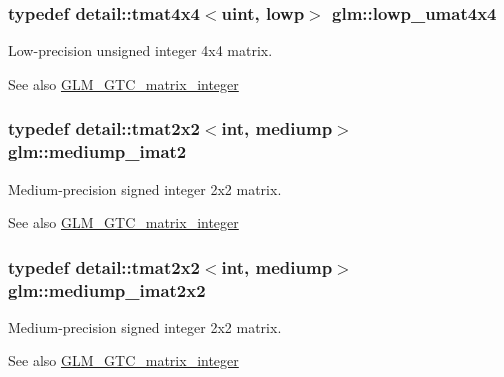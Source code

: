 \subsubsection[{\texorpdfstring{lowp\+\_\+umat4x4}{lowp_umat4x4}}]{\setlength{\rightskip}{0pt plus 5cm}typedef detail\+::tmat4x4$<$uint, lowp$>$ {\bf glm\+::lowp\+\_\+umat4x4}}\hypertarget{group__gtc__matrix__integer_ga394ee910348beffe9c7d6b694d5efe5f}{}\label{group__gtc__matrix__integer_ga394ee910348beffe9c7d6b694d5efe5f}
Low-\/precision unsigned integer 4x4 matrix. \begin{DoxySeeAlso}{See also}
\hyperlink{group__gtc__matrix__integer}{G\+L\+M\+\_\+\+G\+T\+C\+\_\+matrix\+\_\+integer} 
\end{DoxySeeAlso}
\subsubsection[{\texorpdfstring{mediump\+\_\+imat2}{mediump_imat2}}]{\setlength{\rightskip}{0pt plus 5cm}typedef detail\+::tmat2x2$<$int, mediump$>$ {\bf glm\+::mediump\+\_\+imat2}}\hypertarget{group__gtc__matrix__integer_gaec03a8eef2ec2536f8bebffd0bac8192}{}\label{group__gtc__matrix__integer_gaec03a8eef2ec2536f8bebffd0bac8192}
Medium-\/precision signed integer 2x2 matrix. \begin{DoxySeeAlso}{See also}
\hyperlink{group__gtc__matrix__integer}{G\+L\+M\+\_\+\+G\+T\+C\+\_\+matrix\+\_\+integer} 
\end{DoxySeeAlso}
\subsubsection[{\texorpdfstring{mediump\+\_\+imat2x2}{mediump_imat2x2}}]{\setlength{\rightskip}{0pt plus 5cm}typedef detail\+::tmat2x2$<$int, mediump$>$ {\bf glm\+::mediump\+\_\+imat2x2}}\hypertarget{group__gtc__matrix__integer_ga472222f6e3754124ee9cb64acaaedac1}{}\label{group__gtc__matrix__integer_ga472222f6e3754124ee9cb64acaaedac1}
Medium-\/precision signed integer 2x2 matrix. \begin{DoxySeeAlso}{See also}
\hyperlink{group__gtc__matrix__integer}{G\+L\+M\+\_\+\+G\+T\+C\+\_\+matrix\+\_\+integer} 
\end{DoxySeeAlso}
